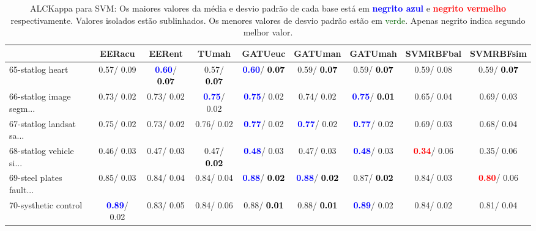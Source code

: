\begin{table}[h]
\caption{ALCKappa para SVM: Os maiores valores da média e desvio padrão de cada base está em \textcolor{blue}{\textbf{negrito azul}} e \textcolor{red}{\textbf{negrito vermelho}} respectivamente. Valores isolados estão sublinhados. Os menores valores de desvio padrão estão em \textcolor{darkgreen}{verde}. Apenas negrito indica segundo melhor valor.}
\begin{center}\begin{tabular}{lc|c|c|c|c|c|c|c}
 & EERacu & EERent & TUmah & \textbf{GATUeuc} & \textbf{GATUman} & \textbf{GATUmah} & SVMRBFbal & SVMRBFsim\\ \hline 65-statlog heart &   0.57/  0.09 & \textcolor{blue}{\textbf{  0.60}}/\textcolor{black}{\textbf{  0.07}} &   0.57/\textcolor{black}{\textbf{  0.07}} & \textcolor{blue}{\textbf{  0.60}}/\textcolor{black}{\textbf{  0.07}} &   0.59/\textcolor{black}{\textbf{  0.07}} &   0.59/\textcolor{black}{\textbf{  0.07}} &   0.59/  0.08 &   0.59/\textcolor{black}{\textbf{  0.07}} \\
66-statlog image segm... &   0.73/  0.02 &   0.73/  0.02 & \textcolor{blue}{\textbf{  0.75}}/  0.02 & \textcolor{blue}{\textbf{  0.75}}/  0.02 &   0.74/  0.02 & \textcolor{blue}{\textbf{  0.75}}/\textcolor{black}{\textbf{  0.01}} &   0.65/  0.04 &   0.69/  0.03 \\
67-statlog landsat sa... &   0.75/  0.02 &   0.73/  0.02 &   0.76/  0.02 & \textcolor{blue}{\textbf{  0.77}}/  0.02 & \textcolor{blue}{\textbf{  0.77}}/  0.02 & \textcolor{blue}{\textbf{  0.77}}/  0.02 &   0.69/  0.03 &   0.68/  0.04 \\
68-statlog vehicle si... &   0.46/  0.03 &   0.47/  0.03 &   0.47/\textcolor{black}{\textbf{  0.02}} & \textcolor{blue}{\textbf{  0.48}}/  0.03 &   0.47/  0.03 & \textcolor{blue}{\textbf{  0.48}}/  0.03 & \textcolor{red}{\textbf{  0.34}}/  0.06 &   0.35/  0.06 \\
69-steel plates fault... &   0.85/  0.03 &   0.84/  0.04 &   0.84/  0.04 & \textcolor{blue}{\textbf{  0.88}}/\textcolor{black}{\textbf{  0.02}} & \textcolor{blue}{\textbf{  0.88}}/\textcolor{black}{\textbf{  0.02}} &   0.87/\textcolor{black}{\textbf{  0.02}} &   0.84/  0.03 & \textcolor{red}{\textbf{  0.80}}/  0.06 \\
70-systhetic control & \textcolor{blue}{\textbf{  0.89}}/  0.02 &   0.83/  0.05 &   0.84/  0.06 &   0.88/\textcolor{black}{\textbf{  0.01}} &   0.88/\textcolor{black}{\textbf{  0.01}} & \textcolor{blue}{\textbf{  0.89}}/  0.02 &   0.84/  0.02 &   0.81/  0.04 \\

\end{tabular}
\end{center}
\end{table}
